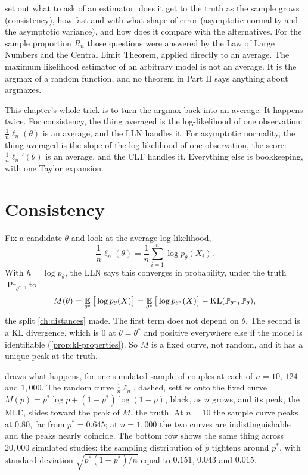  set out what to ask of an estimator: does it get to the truth as the sample grows (consistency), how fast and with what shape of error (asymptotic normality and the asymptotic variance), and how does it compare with the alternatives.
For the sample proportion $\bar{R}_n$ those questions were answered by the Law of Large Numbers and the Central Limit Theorem, applied directly to an average.
The maximum likelihood estimator of an arbitrary model is not an average.
It is the argmax of a random function, and no theorem in Part II says anything about argmaxes.

This chapter's whole trick is to turn the argmax back into an average.
It happens twice.
For consistency, the thing averaged is the log-likelihood of one observation: $\frac1n\ell_n(\theta)$ is an average, and the LLN handles it.
For asymptotic normality, the thing averaged is the slope of the log-likelihood of one observation, the score: $\frac1n\ell_n'(\theta)$ is an average, and the CLT handles it.
Everything else is bookkeeping, with one Taylor expansion.

\section{Consistency}
\label{sec:mle-consistency}


Fix a candidate $\theta$ and look at the average log-likelihood,
\[
\frac1n\ell_n(\theta) = \frac1n\sum_{i=1}^n \log p_\theta(X_i).
\]
With $h = \log p_\theta$, the LLN says this converges in probability, under the truth $\Pr_{\theta^*}$, to
\[
M(\theta) = \operatorname*{\mathbb{E}}_{\theta^*}\big[\log p_\theta(X)\big] = \operatorname*{\mathbb{E}}_{\theta^*}\big[\log p_{\theta^*}(X)\big] - \mathrm{KL}(\mathbb{P}_{\theta^*}, \mathbb{P}_\theta),
\]
the split \cref{ch:distances} made.
The first term does not depend on $\theta$.
The second is a KL divergence, which is $0$ at $\theta = \theta^*$ and positive everywhere else if the model is identifiable (\cref{prop:kl-properties}).
So $M$ is a fixed curve, not random, and it has a unique peak at the truth.

 draws what happens, for one simulated sample of couples at each of $n = 10$, $124$ and $1{,}000$.
The random curve $\frac1n\ell_n$, dashed, settles onto the fixed curve $M(p) = p^*\log p + (1 - p^*)\log(1 - p)$, black, as $n$ grows, and its peak, the MLE, slides toward the peak of $M$, the truth.
At $n = 10$ the sample curve peaks at $0.80$, far from $p^* = 0.645$; at $n = 1{,}000$ the two curves are indistinguishable and the peaks nearly coincide.
The bottom row shows the same thing across $20{,}000$ simulated studies: the sampling distribution of $\hat{p}$ tightens around $p^*$, with standard deviation $\sqrt{p^*(1 - p^*)/n}$ equal to $0.151$, $0.043$ and $0.015$.

